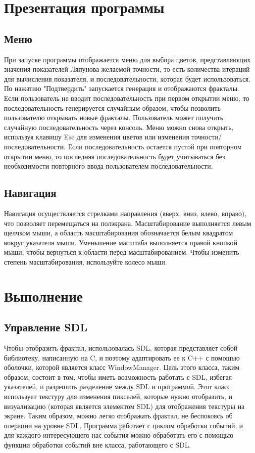 \documentclass[a5paper,10pt, twoside]{article} %
\begin{document}
\section{Презентация программы}

  \subsection{Меню}

  При запуске программы отображается меню для выбора цветов, представляющих значения показателей Ляпунова
  желаемой точности, то есть количества итераций для вычисления показателя, и последовательности, которая будет использоваться.
  По нажатию "Подтвердить" запускается генерация и отображаются фракталы.
  Если пользователь не вводит последовательность при первом открытии меню, то последовательность генерируется случайным образом, 
  чтобы позволить пользователю открывать новые фракталы.
  Пользователь может получить случайную последовательность через консоль.
  Меню можно снова открыть, используя клавишу Esc для изменения цветов или изменения точности/последовательности.
  Если последовательность остается пустой при повторном открытии меню, то последняя последовательность будет учитываться 
  без необходимости повторного ввода пользователем последовательности.

  \subsection{Навигация}

  Навигация осуществляется стрелками направления (вверх, вниз, влево, вправо), что позволяет перемещаться на полэкрана.
  Масштабирование выполняется левым щелчком мыши, а область масштабирования обозначается белым квадратом вокруг указателя мыши.
  Уменьшение масштаба выполняется правой кнопкой мыши, чтобы вернуться к области перед масштабированием.
  Чтобы изменить степень масштабирования, используйте колесо мыши.

\section{Выполнение}
  
  \subsection{Управление SDL}

  Чтобы отобразить фрактал, использовалась SDL, которая представляет собой библиотеку, написанную на C, 
  и поэтому адаптировать ее к C++ с помощью оболочки, которой является класс WindowManager.
  Цель этого класса, таким образом, состоит в том, чтобы иметь возможность работать с SDL, избегая указателей, 
  и разрешить разделение между SDL и программой.
  Этот класс использует текстуру для изменения пикселей, которые нужно отобразить, и визуализацию 
  (которая является элементом SDL) для отображения текстуры на экране.
  Таким образом, можно легко отображать фрактал, не беспокоясь об операции на уровне SDL.
  Программа работает с циклом обработки событий, и для каждого интересующего нас события 
  можно обработать его с помощью функции обработки событий вне класса, работающего с SDL.
\end{document}
